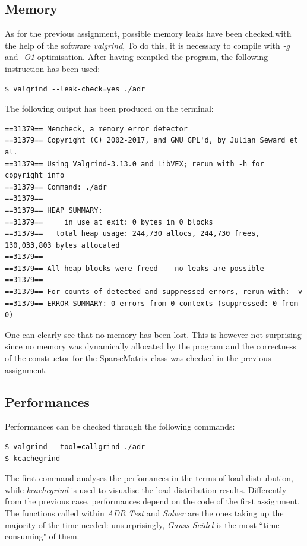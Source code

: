 \documentclass[11pt]{article}
\theoremstyle{theorem}
\theoremstyle{definition}
\begin{document}
\subsection{Memory}
As for the previous assignment, possible memory leaks have been checked.with the help of the software \emph{valgrind}, To do this, it is necessary to compile with \emph{-g} and \emph{-O1} optimisation. After having compiled the program, the following instruction has been used:


\begin{lstlisting}
$ valgrind --leak-check=yes ./adr
\end{lstlisting}


The following output has been produced on the terminal:

\begin{verbatim}
==31379== Memcheck, a memory error detector
==31379== Copyright (C) 2002-2017, and GNU GPL'd, by Julian Seward et al.
==31379== Using Valgrind-3.13.0 and LibVEX; rerun with -h for copyright info
==31379== Command: ./adr
==31379==
==31379== HEAP SUMMARY:
==31379==     in use at exit: 0 bytes in 0 blocks
==31379==   total heap usage: 244,730 allocs, 244,730 frees, 130,033,803 bytes allocated
==31379==
==31379== All heap blocks were freed -- no leaks are possible
==31379==
==31379== For counts of detected and suppressed errors, rerun with: -v
==31379== ERROR SUMMARY: 0 errors from 0 contexts (suppressed: 0 from 0)
\end{verbatim}

One can clearly see that no memory has been lost. This is however not surprising since no memory was dynamically allocated by the program and the correctness of the constructor for the SparseMatrix class was checked in the previous assignment.\\

\subsection{Performances}
\label{subsec:perf}
Performances can be checked through the following commands:
\begin{verbatim}
$ valgrind --tool=callgrind ./adr
$ kcachegrind
\end{verbatim}

The first command analyses the perfomances in the terms of load distrubution, while \emph{kcachegrind} is used to visualise the load distribution results. Differently from the previous case, performances depend on the code of the first assignment. The functions called within \emph{ADR$\_$Test} and \emph{Solver} are the ones taking up the majority of the time needed: unsurprisingly, \emph{Gauss-Seidel} is the most ``time-consuming" of them.\\
\end{document}
